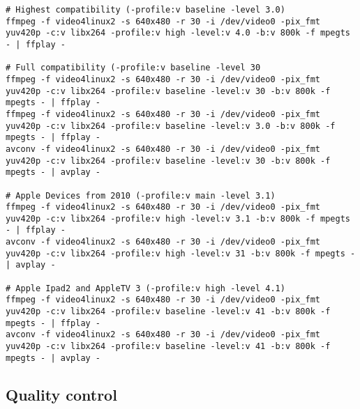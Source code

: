 \begin{verbatim}
# Highest compatibility (-profile:v baseline -level 3.0)
ffmpeg -f video4linux2 -s 640x480 -r 30 -i /dev/video0 -pix_fmt yuv420p -c:v libx264 -profile:v high -level:v 4.0 -b:v 800k -f mpegts - | ffplay -

# Full compatibility (-profile:v baseline -level 30
ffmpeg -f video4linux2 -s 640x480 -r 30 -i /dev/video0 -pix_fmt yuv420p -c:v libx264 -profile:v baseline -level:v 30 -b:v 800k -f mpegts - | ffplay -
ffmpeg -f video4linux2 -s 640x480 -r 30 -i /dev/video0 -pix_fmt yuv420p -c:v libx264 -profile:v baseline -level:v 3.0 -b:v 800k -f mpegts - | ffplay -
avconv -f video4linux2 -s 640x480 -r 30 -i /dev/video0 -pix_fmt yuv420p -c:v libx264 -profile:v baseline -level:v 30 -b:v 800k -f mpegts - | avplay -

# Apple Devices from 2010 (-profile:v main -level 3.1)
ffmpeg -f video4linux2 -s 640x480 -r 30 -i /dev/video0 -pix_fmt yuv420p -c:v libx264 -profile:v high -level:v 3.1 -b:v 800k -f mpegts - | ffplay -
avconv -f video4linux2 -s 640x480 -r 30 -i /dev/video0 -pix_fmt yuv420p -c:v libx264 -profile:v high -level:v 31 -b:v 800k -f mpegts - | avplay -

# Apple Ipad2 and AppleTV 3 (-profile:v high -level 4.1)
ffmpeg -f video4linux2 -s 640x480 -r 30 -i /dev/video0 -pix_fmt yuv420p -c:v libx264 -profile:v baseline -level:v 41 -b:v 800k -f mpegts - | ffplay -
avconv -f video4linux2 -s 640x480 -r 30 -i /dev/video0 -pix_fmt yuv420p -c:v libx264 -profile:v baseline -level:v 41 -b:v 800k -f mpegts - | avplay -
\end{verbatim}


\subsection{Quality control}

